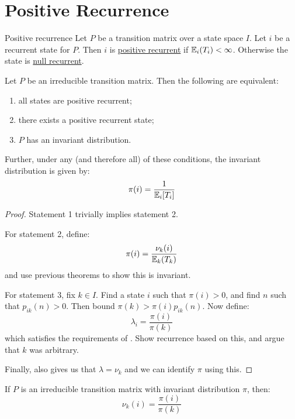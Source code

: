 \documentclass[../Main.tex]{subfiles}
\begin{document}
\section{Positive Recurrence}
\begin{definition}{Positive recurrence}
    Let $P$ be a transition matrix over a state space $I$. Let $i$ be a recurrent state for $P$. Then $i$ is \underline{positive recurrent} if $\mathbb{E}_i(T_i) < \infty$. Otherwise the state is \underline{null recurrent}.
\end{definition}
\begin{theorem}
    Let $P$ be an irreducible transition matrix. Then the following are equivalent:
    \begin{enumerate}
        \item all states are positive recurrent;
        \item there exists a positive recurrent state;
        \item $P$ has an invariant distribution.
    \end{enumerate}
    Further, under any (and therefore all) of these conditions, the invariant distribution is given by:
    \begin{equation*}
        \pi(i) = \frac{1}{\mathbb{E}_i[T_i]}
    \end{equation*}
    \label{thmPosRecurEquivs}
\end{theorem}
\begin{proof}
    Statement 1 trivially implies statement 2.
    
    For statement 2, define:
    \begin{equation*}
        \pi(i) = \frac{\nu_k(i)}{\mathbb{E}_k(T_k)}
    \end{equation*}
    and use previous theorems to show this is invariant.

    For statement 3, fix $k \in I$. Find a state $i$ such that $\pi(i) > 0$, and find $n$ such that $p_{ik}(n) > 0$. Then bound $\pi(k) > \pi(i) p_{ik}(n)$. Now define:
    \begin{equation*}
        \lambda_i = \frac{\pi(i)}{\pi(k)}
    \end{equation*}
    which satisfies the requirements of . Show recurrence based on this, and argue that $k$ was arbitrary.

    Finally,  also gives us that $\lambda = \nu_k$ and we can identify $\pi$ using this.
\end{proof}
\begin{corollary}
    If $P$ is an irreducible transition matrix with invariant distribution $\pi$, then:
    \begin{equation*}
        \nu_k(i) = \frac{\pi(i)}{\pi(k)}
    \end{equation*}
    \label{corNuFromAnyDist}
\end{corollary}
\end{document}
